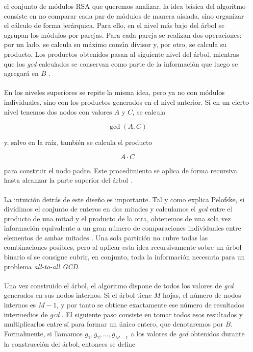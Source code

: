 el conjunto de módulos RSA que queremos analizar, la idea básica del algoritmo consiste en no comparar cada par de módulos de manera aislada, sino organizar el cálculo de forma jerárquica. Para ello, en el nivel más bajo del árbol se agrupan los módulos por parejas. Para cada pareja se realizan dos operaciones: por un lado, se calcula su máximo común divisor y, por otro, se calcula su producto. Los productos obtenidos pasan al siguiente nivel del árbol, mientras que los \textit{gcd} calculados se conservan como parte de la información que luego se agregará en \(B\) \cite{pelofske2024efficient}.
\\
\\
En los niveles superiores se repite la misma idea, pero ya no con módulos individuales, sino con los productos generados en el nivel anterior. Si en un cierto nivel tenemos dos nodos con valores \(A\) y \(C\), se calcula

\[
\gcd(A,C)
\]

y, salvo en la raíz, también se calcula el producto

\[
A \cdot C
\]

para construir el nodo padre. Este procedimiento se aplica de forma recursiva hasta alcanzar la parte superior del árbol \cite{pelofske2024efficient}.
\\
\\
La intuición detrás de este diseño es importante. Tal y como explica Pelofske, si dividimos el conjunto de enteros en dos mitades y calculamos el \textit{gcd} entre el producto de una mitad y el producto de la otra, obtenemos de una sola vez información equivalente a un gran número de comparaciones individuales entre elementos de ambas mitades \cite{pelofske2024efficient}. Una sola partición no cubre todas las combinaciones posibles, pero al aplicar esta idea recursivamente sobre un árbol binario sí se consigue cubrir, en conjunto, toda la información necesaria para un problema \textit{all-to-all GCD}.
\\
\\
Una vez construido el árbol, el algoritmo dispone de todos los valores de \textit{gcd} generados en sus nodos internos. Si el árbol tiene \(M\) hojas, el número de nodos internos es \(M-1\), y por tanto se obtiene exactamente ese número de resultados intermedios de \textit{gcd} \cite{pelofske2024efficient}. El siguiente paso consiste en tomar todos esos resultados y multiplicarlos entre sí para formar un único entero, que denotaremos por \(B\). Formalmente, si llamamos \(g_1, g_2, \dots, g_{M-1}\) a los valores de \textit{gcd} obtenidos durante la construcción del árbol, entonces se define

